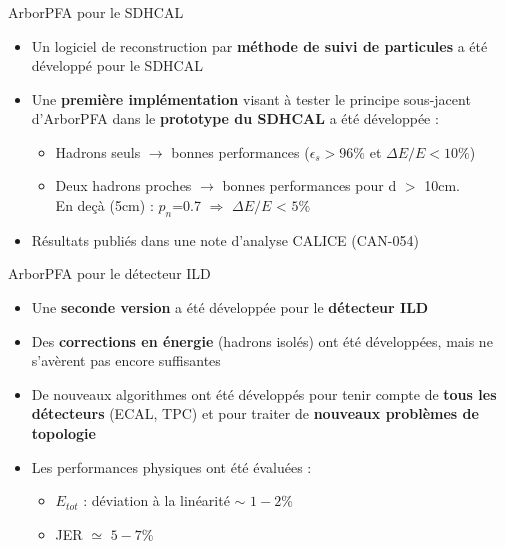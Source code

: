 \documentclass[8pt]{beamer}
\begin{document}
  \begin{frame}
  \frametitle{\secname}
  \framesubtitle{\subsecname}
    \begin{block}{ArborPFA pour le SDHCAL}
      \begin{itemize}
        \item Un logiciel de reconstruction par \textbf{méthode de suivi de particules} a été développé pour le SDHCAL
        \item Une \textbf{première implémentation} visant à tester le principe sous-jacent d'ArborPFA dans le \textbf{prototype du SDHCAL} a été développée :
        \begin{itemize}
          \item Hadrons seuls $\rightarrow$ bonnes performances ($\epsilon_s > 96\%$ et $\Delta E/E < 10\%$)
          \item Deux hadrons proches $\rightarrow$ bonnes performances pour d $>$ 10cm. \\
          En deçà (5cm) : $p_n$=0.7 $\Rightarrow$ $\Delta E/E$ < $5\%$
        \end{itemize}
        \item Résultats publiés dans une note d'analyse CALICE (CAN-054)
      \end{itemize}
    \end{block}
    \begin{block}{ArborPFA pour le détecteur ILD}
      \begin{itemize}
        \item Une \textbf{seconde version} a été développée pour le \textbf{détecteur ILD}
        \item Des \textbf{corrections en énergie} (hadrons isolés) ont été développées, mais ne s'avèrent pas encore suffisantes
        \item De nouveaux algorithmes ont été développés pour tenir compte de \textbf{tous les détecteurs} (ECAL, TPC) et pour traiter de \textbf{nouveaux problèmes de topologie}
        \item Les performances physiques ont été évaluées :
        \begin{itemize}
          \item $E_{tot}$ : déviation à la linéarité $\sim$ $1-2\%$
          \item JER $\simeq$ $5-7\%$
        \end{itemize}
      \end{itemize}
    \end{block}
  \end{frame}
\end{document}
